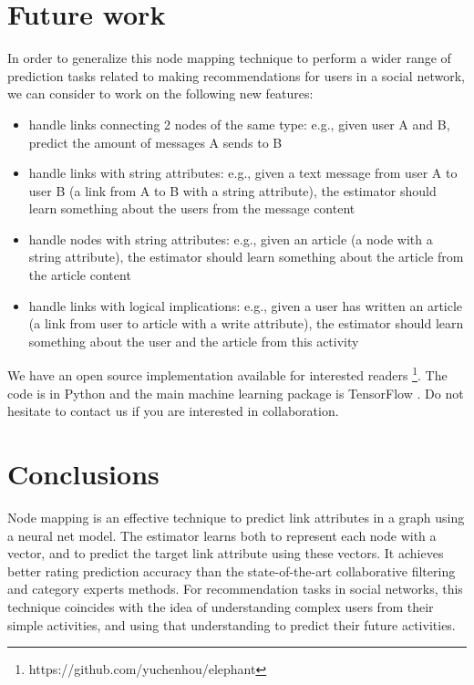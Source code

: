 \documentclass{article}
\begin{document}
\section{Future work}
In order to generalize this node mapping technique to perform a wider range of 
prediction tasks related to making recommendations for users in a social 
network, we can consider to work on the following new features:
\begin{itemize}
	\item handle links connecting 2 nodes of the same type: e.g., given user A 
	and B, predict the amount of messages A sends to B
	\item handle links with string attributes: e.g., given a text message from 
	user A to user B (a link from A to B with a string attribute), the 
	estimator should learn something about the users from the message content
	\item handle nodes with string attributes: e.g., given an article (a node 
	with a string attribute), the estimator should learn something about the 
	article from the article content
	\item handle links with logical implications: e.g., given a user has 
	written an article (a link from user to article with a write attribute), 
	the estimator should learn something about the user and the article from 
	this activity
\end{itemize}
We have an open source implementation available for interested readers  
\footnote{https://github.com/yuchenhou/elephant}.
The code is in Python and the main machine learning package is TensorFlow 
\cite{abadi2016tensorflow}.
Do not hesitate to contact us if you are interested in collaboration.

\section{Conclusions}
Node mapping is an effective technique to predict link attributes in a graph 
using a neural net model.
The estimator learns both to represent each node with a vector, and to predict 
the target link attribute using these vectors.
It achieves better rating prediction accuracy than the state-of-the-art 
collaborative filtering and category experts methods.
For recommendation tasks in social networks, this technique coincides with the 
idea of understanding complex users from their simple activities, and using 
that understanding to predict their future activities.



\end{document}
